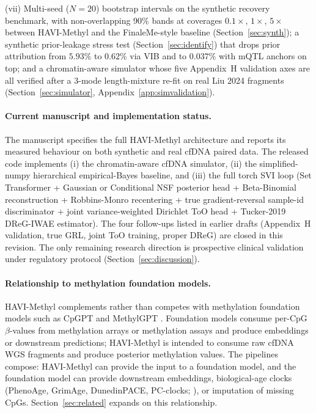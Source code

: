 \noindent (vii) Multi-seed ($N=20$) bootstrap intervals on the synthetic recovery benchmark, with non-overlapping 90\% bands at coverages $0.1\times$, $1\times$, $5\times$ between HAVI-Methyl and the FinaleMe-style baseline (Section~\ref{sec:synth}); a synthetic prior-leakage stress test (Section~\ref{sec:identify}) that drops prior attribution from $5.93\%$ to $0.62\%$ via VIB and to $0.037\%$ with mQTL anchors on top; and a chromatin-aware simulator whose five Appendix~H validation axes are all verified after a 3-mode length-mixture re-fit on real Liu 2024 fragments (Section~\ref{sec:simulator}, Appendix~\ref{app:simvalidation}).

\paragraph{Current manuscript and implementation status.} The manuscript specifies the full HAVI-Methyl architecture and reports its measured behaviour on both synthetic and real cfDNA paired data. The released code implements (i) the chromatin-aware cfDNA simulator, (ii) the simplified-numpy hierarchical empirical-Bayes baseline, and (iii) the full torch SVI loop (Set Transformer + Gaussian or Conditional NSF posterior head + Beta-Binomial reconstruction + Robbins-Monro recentering + true gradient-reversal sample-id discriminator + joint variance-weighted Dirichlet ToO head + Tucker-2019 DReG-IWAE estimator). The four follow-ups listed in earlier drafts (Appendix~H validation, true GRL, joint ToO training, proper DReG) are closed in this revision. The only remaining research direction is prospective clinical validation under regulatory protocol (Section~\ref{sec:discussion}).

\paragraph{Relationship to methylation foundation models.} HAVI-Methyl complements rather than competes with methylation foundation models such as CpGPT \citep{cpgpt2024} and MethylGPT \citep{methylgpt2024}. Foundation models consume per-CpG $\beta$-values from methylation arrays or methylation assays and produce embeddings or downstream predictions; HAVI-Methyl is intended to consume raw cfDNA WGS fragments and produce posterior methylation values. The pipelines compose: HAVI-Methyl can provide the input to a foundation model, and the foundation model can provide downstream embeddings, biological-age clocks (PhenoAge, GrimAge, DunedinPACE, PC-clocks; \citealp{horvath2013,levine2018phenoage,lu2019grimage,belsky2022dunedinpace,higginschen2022pcclocks}), or imputation of missing CpGs. Section~\ref{sec:related} expands on this relationship.

